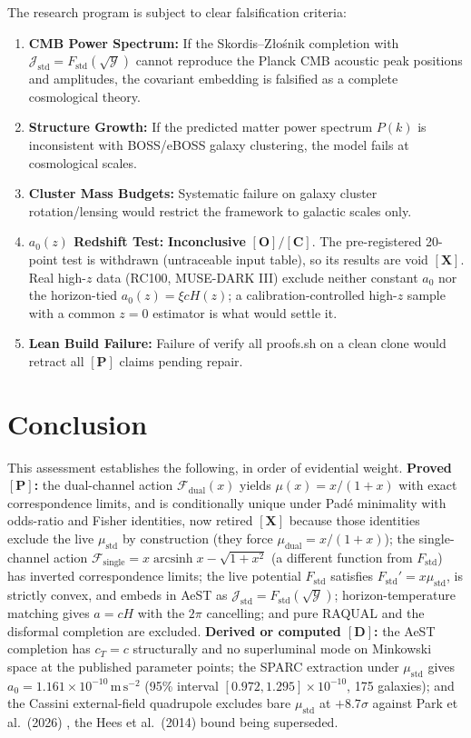 \documentclass[aps,prd,preprint,superscriptaddress,nofootinbib,amsmath,amssymb,floatfix]{revtex4-2}
\makeatletter
\DeclareRobustCommand{\rntexttt}[1]{%
  \ifmmode
    \nfss@text{\ttfamily\hyphenchar\font=-1 #1}%
  \else
    \hmode@bgroup\ttfamily\hyphenchar\font=-1 #1\egroup
  \fi}
\DeclareRobustCommand{\_}{%
    \ifmmode\nfss@text{\textunderscore}\else\textunderscore\penalty\z@\fi}%
\let\texttt\rntexttt
\makeatother
\begin{document}
The research program is subject to clear falsification criteria:
\begin{enumerate}
    \item \textbf{CMB Power Spectrum:} If the Skordis--Z\l{}o\'snik completion with $\mathcal{J}_{\text{std}} = F_{\text{std}}(\sqrt{\mathcal{Y}})$ cannot reproduce the Planck CMB acoustic peak positions and amplitudes, the covariant embedding is falsified as a complete cosmological theory.
    \item \textbf{Structure Growth:} If the predicted matter power spectrum $P(k)$ is inconsistent with BOSS/eBOSS galaxy clustering, the model fails at cosmological scales.
    \item \textbf{Cluster Mass Budgets:} Systematic failure on galaxy cluster rotation/lensing would restrict the framework to galactic scales only.
    \item \textbf{$a_0(z)$ Redshift Test:} \textbf{Inconclusive} $\mathbf{[O]/[C]}$. The pre-registered 20-point test is withdrawn (untraceable input table), so its results are void $\mathbf{[X]}$. Real high-$z$ data (RC100, MUSE-DARK III) exclude neither constant $a_0$ nor the horizon-tied $a_0(z) = \xi c H(z)$; a calibration-controlled high-$z$ sample with a common $z=0$ estimator is what would settle it.
    \item \textbf{Lean Build Failure:} Failure of \texttt{verify\_all\_proofs.sh} on a clean clone would retract all $\mathbf{[P]}$ claims pending repair.
\end{enumerate}

\section{Conclusion}
\label{sec:conclusion}

This assessment establishes the following, in order of evidential weight. \textbf{Proved $\mathbf{[P]}$:} the dual-channel action $\mathcal{F}_{\text{dual}}(x)$ yields $\mu(x) = x/(1+x)$ with exact correspondence limits, and is conditionally unique under Pad\'e minimality with odds-ratio and Fisher identities, now retired $\mathbf{[X]}$ because those identities exclude the live $\mu_{\text{std}}$ by construction (they force $\mu_{\text{dual}} = x/(1+x)$); the single-channel action $\mathcal{F}_{\text{single}} = x\operatorname{arcsinh}x - \sqrt{1+x^2}$ (a different function from $F_{\text{std}}$) has inverted correspondence limits; the live potential $F_{\text{std}}$ satisfies $F_{\text{std}}' = x\mu_{\text{std}}$, is strictly convex, and embeds in AeST as $\mathcal{J}_{\text{std}} = F_{\text{std}}(\sqrt{\mathcal{Y}})$; horizon-temperature matching gives $a = cH$ with the $2\pi$ cancelling; and pure RAQUAL and the disformal completion are excluded. \textbf{Derived or computed $\mathbf{[D]}$:} the AeST completion has $c_T = c$ structurally and no superluminal mode on Minkowski space at the published parameter points; the SPARC extraction under $\mu_{\text{std}}$ gives $a_0 = 1.161\times10^{-10}\,\mathrm{m\,s^{-2}}$ (95\% interval $[0.972, 1.295]\times10^{-10}$, 175 galaxies); and the Cassini external-field quadrupole excludes bare $\mu_{\text{std}}$ at $+8.7\sigma$ against Park et al.\ (2026) \cite{Park2026}, the Hees et al.\ (2014) bound \cite{Hees2014} being superseded.
\end{document}
